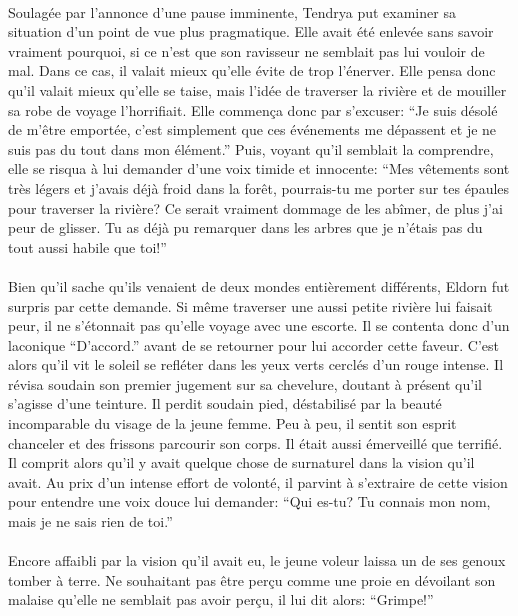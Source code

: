 \paragraph{}
Soulagée par l'annonce d'une pause imminente, Tendrya put examiner sa
situation d'un point de vue plus pragmatique. Elle avait été enlevée sans
savoir vraiment pourquoi, si ce n'est que son ravisseur ne semblait pas lui
vouloir de mal. Dans ce cas, il valait mieux qu'elle évite de trop l'énerver.
Elle pensa donc qu'il valait mieux qu'elle se taise, mais l'idée de traverser
la rivière et de mouiller sa robe de voyage l'horrifiait. Elle commença donc
par s'excuser: ``Je suis désolé de m'être emportée, c'est simplement que ces
événements me dépassent et je ne suis pas du tout dans mon élément.'' Puis,
voyant qu'il semblait la comprendre, elle se risqua à lui demander d'une voix
timide et innocente: ``Mes vêtements sont très légers et j'avais déjà froid
dans la forêt, pourrais-tu me porter sur tes épaules pour traverser la
rivière? Ce serait vraiment dommage de les abîmer, de plus j'ai peur de
glisser. Tu as déjà pu remarquer dans les arbres que je n'étais pas du tout
aussi habile que toi!''

\paragraph{}
Bien qu'il sache qu'ils venaient de deux mondes entièrement différents, Eldorn
fut surpris par cette demande. Si même traverser une aussi petite rivière lui
faisait peur, il ne s'étonnait pas qu'elle voyage avec une escorte. Il se
contenta donc d'un laconique ``D'accord.'' avant de se retourner pour lui
accorder cette faveur. C'est alors qu'il vit le soleil se refléter dans les
yeux verts cerclés d'un rouge intense. Il révisa soudain son premier jugement
sur sa chevelure, doutant à présent qu'il s'agisse d'une teinture. Il perdit
soudain pied, déstabilisé par la beauté incomparable du visage de la jeune
femme. Peu à peu, il sentit son esprit chanceler et des frissons parcourir son
corps. Il était aussi émerveillé que terrifié. Il comprit alors qu'il y avait
quelque chose de surnaturel dans la vision qu'il avait. Au prix d'un intense
effort de volonté, il parvint à s'extraire de cette vision pour entendre une
voix douce lui demander: ``Qui es-tu? Tu connais mon nom, mais je ne sais rien
de toi.''

\paragraph{}
Encore affaibli par la vision qu'il avait eu, le jeune voleur laissa un de ses
genoux tomber à terre. Ne souhaitant pas être perçu comme une proie en
dévoilant son malaise qu'elle ne semblait pas avoir perçu, il lui dit alors:
``Grimpe!''
